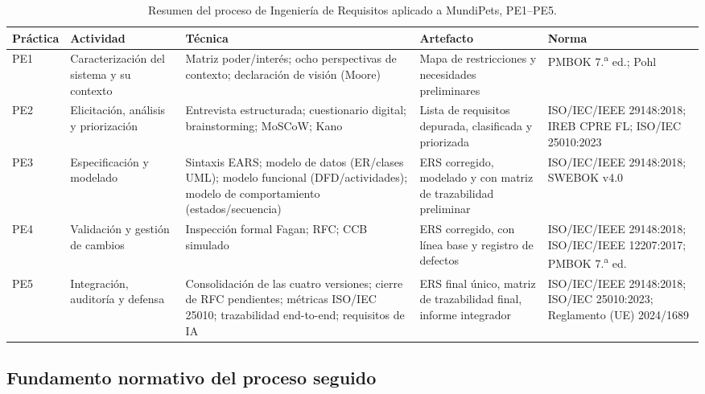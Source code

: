 \documentclass[journal,onecolumn]{IEEEtran}
\begin{document}
\begin{table}[H]
	\centering
	\caption{Resumen del proceso de Ingeniería de Requisitos aplicado a MundiPets, PE1--PE5.}
	\label{tab:resumen-metodologia}
	\footnotesize
	\renewcommand{\arraystretch}{1.3}
	\begin{tabularx}{\textwidth}{
			|>{\raggedright\arraybackslash}p{0.9cm}
			|>{\raggedright\arraybackslash}p{2.3cm}
			|>{\raggedright\arraybackslash}X
			|>{\raggedright\arraybackslash}p{3.1cm}
			|>{\raggedright\arraybackslash}p{3.4cm}|}
		\hline
		\textbf{Práctica} & \textbf{Actividad} & \textbf{Técnica} & \textbf{Artefacto} & \textbf{Norma} \\
		\hline
		PE1 & Caracterización del sistema y su contexto & Matriz poder/interés; ocho perspectivas de contexto; declaración de visión (Moore) & Mapa de restricciones y necesidades preliminares & PMBOK 7.\textsuperscript{a} ed.; Pohl \\
		\hline
		PE2 & Elicitación, análisis y priorización & Entrevista estructurada; cuestionario digital; brainstorming; MoSCoW; Kano & Lista de requisitos depurada, clasificada y priorizada & ISO/IEC/IEEE 29148:2018; IREB CPRE FL; ISO/IEC 25010:2023 \\
		\hline
		PE3 & Especificación y modelado & Sintaxis EARS; modelo de datos (ER/clases UML); modelo funcional (DFD/actividades); modelo de comportamiento (estados/secuencia) & ERS corregido, modelado y con matriz de trazabilidad preliminar & ISO/IEC/IEEE 29148:2018; SWEBOK v4.0 \\
		\hline
		PE4 & Validación y gestión de cambios & Inspección formal Fagan; RFC; CCB simulado & ERS corregido, con línea base y registro de defectos & ISO/IEC/IEEE 29148:2018; ISO/IEC/IEEE 12207:2017; PMBOK 7.\textsuperscript{a} ed. \\
		\hline
		PE5 & Integración, auditoría y defensa & Consolidación de las cuatro versiones; cierre de RFC pendientes; métricas ISO/IEC 25010; trazabilidad end-to-end; requisitos de IA & ERS final único, matriz de trazabilidad final, informe integrador & ISO/IEC/IEEE 29148:2018; ISO/IEC 25010:2023; Reglamento (UE) 2024/1689 \\
		\hline
	\end{tabularx}
\end{table}

\subsection{Fundamento normativo del proceso seguido}
\end{document}
